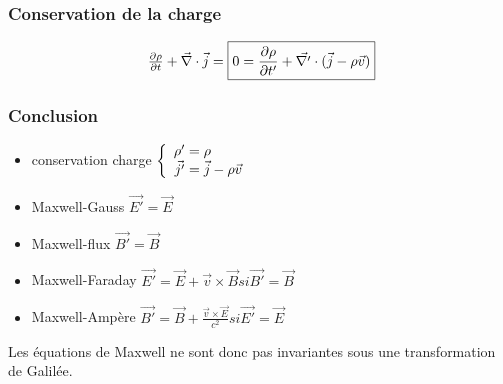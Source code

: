 \subsubsection*{Conservation de la charge}
$$
	\begin{array}{r@{\;}l}
		\frac{\partial\rho}{\partial t}+\nab\cdot\vec{j}=\boxed{0=\frac{\partial\rho}{\partial t'}+\vec{\nabla '}\cdot(\vec{j}-\rho\vec{v})}
	\end{array}
$$

\subsubsection*{Conclusion}
\begin{itemize}
	\item {\renewcommand*{\arraystretch}{1.2} conservation charge $\left\{ \begin{array}{r@{\;}l}
					\rho '&=\rho\\
					\vec{j'}&=\vec{j}-\rho\vec{v}
			\end{array} \right.$}
	\item Maxwell-Gauss $\vec{E '}=\vec{E}$
	\item Maxwell-flux $\vec{B '}=\vec{B}$
	\item Maxwell-Faraday $\vec{E '}=\vec{E}+\vec{v}\times\vec{B} si \vec{B'}=\vec{B}$
	\item Maxwell-Ampère $\vec{B '}=\vec{B}+\frac{\vec{v}\times\vec{E}}{c^2} si \vec{E'}=\vec{E}$
\end{itemize}

Les équations de Maxwell ne sont donc pas invariantes sous une transformation de Galilée.

